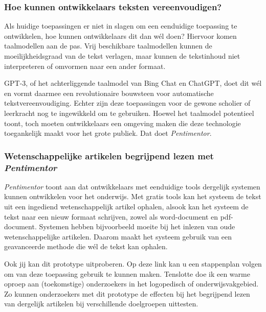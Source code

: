 \documentclass[a4paper,9pt,twoside]{report}
\begin{document}
\subsubsection{Hoe kunnen ontwikkelaars teksten vereenvoudigen?}

\noindent Als huidige toepassingen er niet in slagen om een eenduidige toepassing te ontwikkelen, hoe kunnen ontwikkelaars dit dan wél doen? Hiervoor komen taalmodellen aan de pas. Vrij beschikbare taalmodellen kunnen de moeilijkheidsgraad van de tekst verlagen, maar kunnen de tekstinhoud niet interpreteren of omvormen naar een ander formaat. 

\medspace

\noindent GPT-3, of het achterliggende taalmodel van Bing Chat en ChatGPT, doet dit wél en vormt daarmee een revolutionaire bouwsteen voor automatische tekstvereenvoudiging. Echter zijn deze toepassingen voor de gewone scholier of leerkracht nog te ingewikkeld om te gebruiken. Hoewel het taalmodel potentieel toont, toch moeten ontwikkelaars een omgeving maken die deze technologie toegankelijk maakt voor het grote publiek. Dat doet \textit{Pentimentor}.

\subsubsection{Wetenschappelijke artikelen begrijpend lezen met \textit{Pentimentor}}

\noindent \textit{Pentimentor} toont aan dat ontwikkelaars met eenduidige tools dergelijk systemen kunnen ontwikkelen voor het onderwijs. Met gratis tools kan het systeem de tekst uit een ingediend wetenschappelijk artikel ophalen, alsook kan het systeem de tekst naar een nieuw formaat schrijven, zowel als word-document en pdf-document. Systemen hebben bijvoorbeeld moeite bij het inlezen van oude wetenschappelijke artikelen. Daarom maakt het systeem gebruik van een geavanceerde methode die wél de tekst kan ophalen.

\medspace

\noindent Ook jij kan dit prototype uitproberen. Op deze link kan u een stappenplan volgen om van deze toepassing gebruik te kunnen maken. Tenslotte doe ik een warme oproep aan (toekomstige) onderzoekers in het logopedisch of onderwijsvakgebied. Zo kunnen onderzoekers met dit prototype de effecten bij het begrijpend lezen van dergelijk artikelen bij verschillende doelgroepen uittesten.
\end{document}
